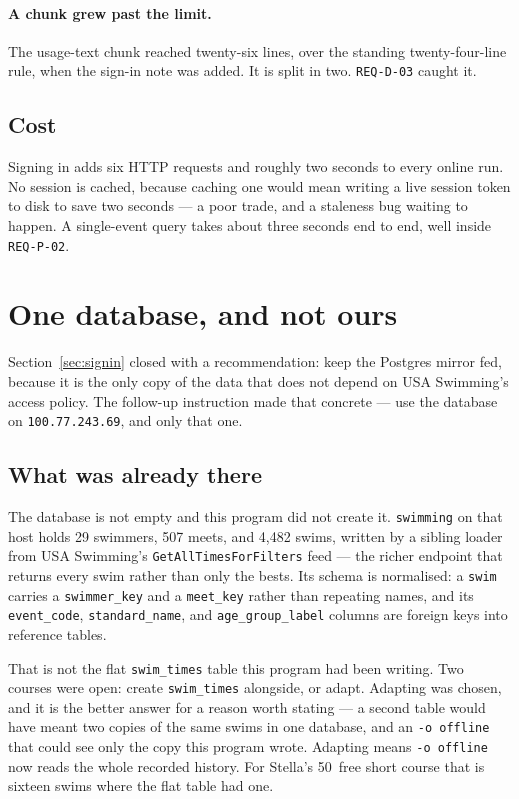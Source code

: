 \documentclass[11pt]{article}
\newcommand{\code}[1]{\texttt{#1}}
\newcommand{\req}[1]{\texttt{#1}}
\begin{document}
\paragraph{A chunk grew past the limit.}
The usage-text chunk reached twenty-six lines, over the standing
twenty-four-line rule, when the sign-in note was added.  It is split in
two.  \req{REQ-D-03} caught it.

\subsection{Cost}

Signing in adds six HTTP requests and roughly two seconds to every
online run.  No session is cached, because caching one would mean
writing a live session token to disk to save two seconds --- a poor
trade, and a staleness bug waiting to happen.  A single-event query
takes about three seconds end to end, well inside \req{REQ-P-02}.

\section{One database, and not ours}\label{sec:onedb}

Section~\ref{sec:signin} closed with a recommendation: keep the
Postgres mirror fed, because it is the only copy of the data that does
not depend on USA Swimming's access policy.  The follow-up instruction
made that concrete --- use the database on \code{100.77.243.69}, and
only that one.

\subsection{What was already there}

The database is not empty and this program did not create it.
\code{swimming} on that host holds 29 swimmers, 507 meets, and 4{,}482
swims, written by a sibling loader from USA Swimming's
\code{GetAllTimesForFilters} feed --- the richer endpoint that returns
every swim rather than only the bests.  Its schema is normalised: a
\code{swim} carries a \code{swimmer\_key} and a \code{meet\_key} rather
than repeating names, and its \code{event\_code},
\code{standard\_name}, and \code{age\_group\_label} columns are foreign
keys into reference tables.

That is not the flat \code{swim\_times} table this program had been
writing.  Two courses were open: create \code{swim\_times} alongside,
or adapt.  Adapting was chosen, and it is the better answer for a
reason worth stating --- a second table would have meant two copies of
the same swims in one database, and an \code{-o offline} that could see
only the copy this program wrote.  Adapting means \code{-o offline} now
reads the whole recorded history.  For Stella's 50~free short course
that is sixteen swims where the flat table had one.
\end{document}
